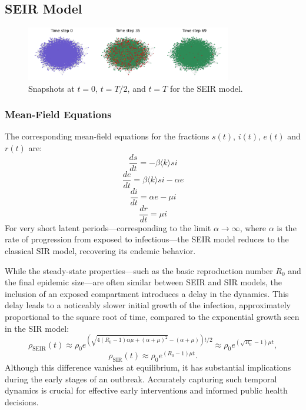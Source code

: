 \subsection{SEIR Model}

\begin{figure}[H]
\centering
\includegraphics[width=0.8\textwidth]{images/Homogeneous/SEIR_snapshots.png}
\caption{Snapshots at $t=0$, $t=T/2$, and $t=T$ for the SEIR model.}
\label{fig:seir_snapshots}
\end{figure}

\subsubsection{Mean-Field Equations}

The corresponding mean-field equations for the fractions $s(t)$, $i(t)$, $e(t)$ and $r(t)$ are:
$$\dfrac{ds}{dt}= -\beta \langle k \rangle si$$
$$\dfrac{de}{dt}=\beta  \langle k \rangle si - \alpha e$$
$$\dfrac{di}{dt}=\alpha e - \mu i$$ 
$$\dfrac{dr}{dt}=\mu i$$
For very short latent periods—corresponding to the limit $\alpha \rightarrow \infty$, where $\alpha$ is the rate of progression from exposed to infectious—the SEIR model reduces to the classical SIR model, recovering its endemic behavior.

While the steady-state properties—such as the basic reproduction number $R_0$ and the final epidemic size—are often similar between SEIR and SIR models, the inclusion of an exposed compartment introduces a delay in the dynamics. This delay leads to a noticeably slower initial growth of the infection, approximately proportional to the square root of time, compared to the exponential growth seen in the SIR model:
\begin{equation}
\rho_{\text{SEIR}}(t) \approx \rho_0 e^{\left(\sqrt{4(R_0 - 1)\alpha \mu + (\alpha + \mu)^2} - (\alpha + \mu)\right)t/2} \approx \rho_0 e^{(\sqrt{R_0} - 1)\mu t},
\end{equation}
\begin{equation}
\rho_{\text{SIR}}(t) \approx \rho_0 e^{(R_0 - 1)\mu t}.
\end{equation}
Although this difference vanishes at equilibrium, it has substantial implications during the early stages of an outbreak. Accurately capturing such temporal dynamics is crucial for effective early interventions and informed public health decisions.



